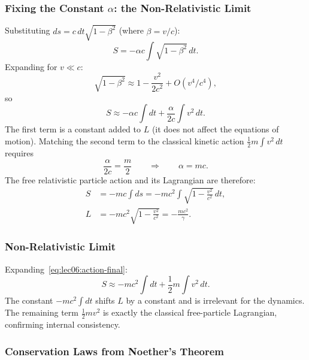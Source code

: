 \subsubsection*{Fixing the Constant \texorpdfstring{$\alpha$}{$\alpha$}: the Non-Relativistic Limit}

Substituting $ds = c\,dt\sqrt{1-\beta^2}$ (where $\beta = v/c$):
\begin{equation}\label{eq:lec06:action-expanded}
    S = -\alpha c \int \sqrt{1-\beta^2}\,dt .
\end{equation}
Expanding for $v \ll c$:
\begin{equation}\label{eq:lec06:sqrt-expansion}
    \sqrt{1-\beta^2} \approx 1 - \frac{v^2}{2c^2} + O(v^4/c^4),
\end{equation}
so
\begin{equation}\label{eq:lec06:action-nr-expand}
    S \approx -\alpha c \int dt + \frac{\alpha}{2c}\int v^2\,dt .
\end{equation}
The first term is a constant added to $L$ (it does not affect the equations
of motion).  Matching the second term to the classical kinetic action
$\frac{1}{2}m\int v^2\,dt$ requires
\begin{equation}\label{eq:lec06:alpha-fixed}
    \frac{\alpha}{2c} = \frac{m}{2}
    \qquad\Longrightarrow\qquad
    \alpha = mc .
\end{equation}
The free relativistic particle action and its Lagrangian are therefore:
\begin{align}
    S &= -mc\int ds = -mc^2\int\sqrt{1-\frac{v^2}{c^2}}\,dt, \label{eq:lec06:action-final}\\[4pt]
    L &= -mc^2\sqrt{1-\frac{v^2}{c^2}} = -\frac{mc^2}{\gamma}. \label{eq:lec06:lagrangian-final}
\end{align}

\subsubsection*{Non-Relativistic Limit}

Expanding~\eqref{eq:lec06:action-final}:
\begin{equation}\label{eq:lec06:action-nr-check}
    S \approx -mc^2\int dt + \frac{1}{2}m\int v^2\,dt .
\end{equation}
The constant $-mc^2\int dt$ shifts $L$ by a constant and is irrelevant for
the dynamics.  The remaining term $\frac{1}{2}mv^2$ is exactly the classical
free-particle Lagrangian, confirming internal consistency.

\subsubsection*{Conservation Laws from Noether's Theorem}

